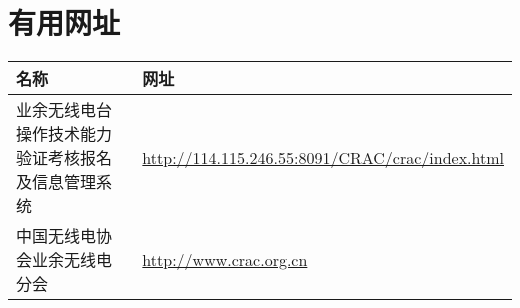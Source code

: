 

\newpage


\section{有用网址}

\begin{longtable}{|p{8cm}|p{8cm}|}
	\hline
	\textbf{名称} & \textbf{网址} \\
	\hline
	业余无线电台操作技术能力验证考核报名及信息管理系统 & \url{http://114.115.246.55:8091/CRAC/crac/index.html} \\
	\hline
	中国无线电协会业余无线电分会 & \url{http://www.crac.org.cn} \\
	\hline
\end{longtable}
